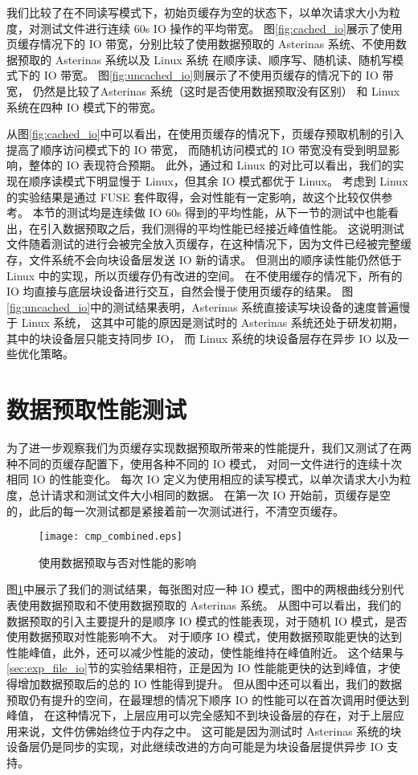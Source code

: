 我们比较了在不同读写模式下，初始页缓存为空的状态下，以单次请求大小为粒度，对测试文件进行连续 60s IO 操作的平均带宽。
图\ref{fig:cached_io}展示了使用页缓存情况下的 IO 带宽，分别比较了使用数据预取的 Asterinas 系统、不使用数据预取的 Asterinas 系统以及 Linux 系统
在顺序读、顺序写、随机读、随机写模式下的 IO 带宽。
图\ref{fig:uncached_io}则展示了不使用页缓存的情况下的 IO 带宽， 仍然是比较了Asterinas 系统（这时是否使用数据预取没有区别）
和 Linux 系统在四种 IO 模式下的带宽。

从图\ref{fig:cached_io}中可以看出，在使用页缓存的情况下，页缓存预取机制的引入提高了顺序访问模式下的 IO 带宽，
而随机访问模式的 IO 带宽没有受到明显影响，整体的 IO 表现符合预期。
此外，通过和 Linux 的对比可以看出，我们的实现在顺序读模式下明显慢于 Linux，但其余 IO 模式都优于 Linux。
考虑到 Linux 的实验结果是通过 FUSE 套件取得，会对性能有一定影响，故这个比较仅供参考。
本节的测试均是连续做 IO 60s 得到的平均性能，从下一节的测试中也能看出，在引入数据预取之后，我们测得的平均性能已经接近峰值性能。
这说明测试文件随着测试的进行会被完全放入页缓存，在这种情况下，因为文件已经被完整缓存，文件系统不会向块设备层发送 IO 新的请求。
但测出的顺序读性能仍然低于 Linux 中的实现，所以页缓存仍有改进的空间。
在不使用缓存的情况下，所有的 IO 均直接与底层块设备进行交互，自然会慢于使用页缓存的结果。
图\ref{fig:uncached_io}中的测试结果表明，Asterinas 系统直接读写块设备的速度普遍慢于 Linux 系统，
这其中可能的原因是测试时的 Asterinas 系统还处于研发初期，其中的块设备层只能支持同步 IO，
而 Linux 系统的块设备层存在异步 IO 以及一些优化策略。

\section{数据预取性能测试}

为了进一步观察我们为页缓存实现数据预取所带来的性能提升，我们又测试了在两种不同的页缓存配置下，使用各种不同的 IO 模式，
对同一文件进行的连续十次相同 IO 的性能变化。
每次 IO 定义为使用相应的读写模式，以单次请求大小为粒度，总计请求和测试文件大小相同的数据。
在第一次 IO 开始前，页缓存是空的，此后的每一次测试都是紧接着前一次测试进行，不清空页缓存。

\begin{figure}[h]
    \centering
    \texttt{[image: cmp\_combined.eps]}
    \caption{使用数据预取与否对性能的影响}
    \label{fig:cmp_ra}
\end{figure}

图\ref{fig:cmp_ra}中展示了我们的测试结果，每张图对应一种 IO 模式，图中的两根曲线分别代表使用数据预取和不使用数据预取的 Asterinas 系统。
从图中可以看出，我们的数据预取的引入主要提升的是顺序 IO 模式的性能表现，对于随机 IO 模式，是否使用数据预取对性能影响不大。
对于顺序 IO 模式，使用数据预取能更快的达到性能峰值，此外，还可以减少性能的波动，使性能维持在峰值附近。
这个结果与\ref{sec:exp_file_io}节的实验结果相符，正是因为 IO 性能能更快的达到峰值，才使得增加数据预取后的总的 IO 性能得到提升。
但从图中还可以看出，我们的数据预取仍有提升的空间，在最理想的情况下顺序 IO 的性能可以在首次调用时便达到峰值，
在这种情况下，上层应用可以完全感知不到块设备层的存在，对于上层应用来说，文件仿佛始终位于内存之中。
这可能是因为测试时 Asterinas 系统的块设备层仍是同步的实现，对此继续改进的方向可能是为块设备层提供异步 IO 支持。
